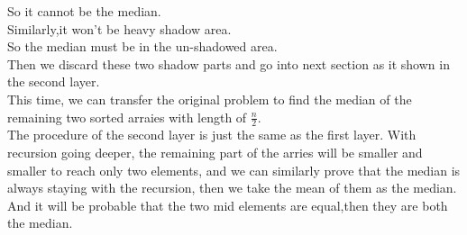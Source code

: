 \documentclass[oneside]{homework} %
\begin{document}
So it cannot be the median.\\ Similarly,it won't be heavy shadow area.\\So the median must be in the un-shadowed area.\\
Then we discard these two shadow parts and go into next section as it shown in the second layer. \\
This time, we can transfer the original problem to find the median of the remaining two sorted arraies with length of $\frac{n}{2}$.\\
The procedure of the second layer is just the same as the first layer. With recursion going deeper, the remaining part of the arries will be smaller and smaller to reach only two elements, and we can similarly prove that the median is always staying with the recursion, then we take the mean of them as the median.\\ And it will be probable that the two mid elements are equal,then they are both the median. 
\end{document}
